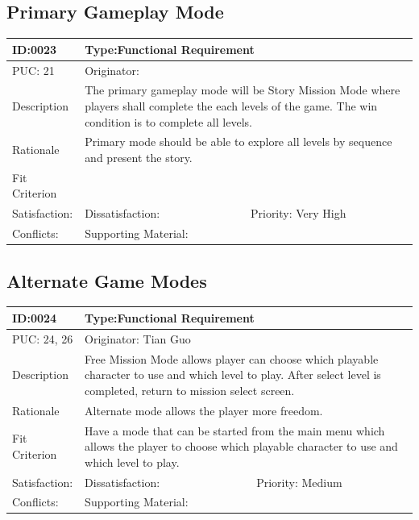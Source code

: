 \documentclass{article}
\begin{document}
	\subsection{Primary Gameplay Mode}


	\begin{table}[H]
		\begin{tabular}{|l|l|l|}
			\hline
			ID:0023 & \multicolumn{2}{l|}{Type:Functional Requirement} \\ \hline
			PUC: 21 & \multicolumn{2}{l|}{Originator:} \\ \hline
			Description & \multicolumn{2}{m{0.85\textwidth}|}{The primary gameplay mode will be Story Mission Mode where players shall complete the each levels of the game. The win condition is to complete all levels.} \\ \hline
			Rationale & \multicolumn{2}{m{0.85\textwidth}|}{Primary mode should be able to explore all levels by sequence and present the story.} \\ \hline
			Fit Criterion & \multicolumn{2}{m{0.85\textwidth}|}{} \\ \hline
			Satisfaction: & Dissatisfaction: & Priority: Very High\\ \hline
			Conflicts: & \multicolumn{2}{l|}{Supporting Material:} \\ \hline
		\end{tabular}
	\end{table}

	\subsection{Alternate Game Modes}


	\begin{table}[H]
		\begin{tabular}{|l|l|l|}
			\hline
			ID:0024 & \multicolumn{2}{l|}{Type:Functional Requirement} \\ \hline
			PUC: 24, 26 & \multicolumn{2}{l|}{Originator: Tian Guo} \\ \hline
			Description & \multicolumn{2}{m{0.85\textwidth}|}{Free Mission Mode allows player can choose which playable character to use and which level to play. After select level is completed, return to mission select screen.} \\ \hline
			Rationale & \multicolumn{2}{m{0.85\textwidth}|}{Alternate mode allows the player more freedom.} \\ \hline
			Fit Criterion & \multicolumn{2}{m{0.85\textwidth}|}{Have a mode that can be started from the main menu which allows the player to choose which playable character to use and which level to play. } \\ \hline
			Satisfaction: & Dissatisfaction: & Priority: Medium\\ \hline
			Conflicts: & \multicolumn{2}{l|}{Supporting Material:} \\ \hline
		\end{tabular}
	\end{table}
\end{document}
